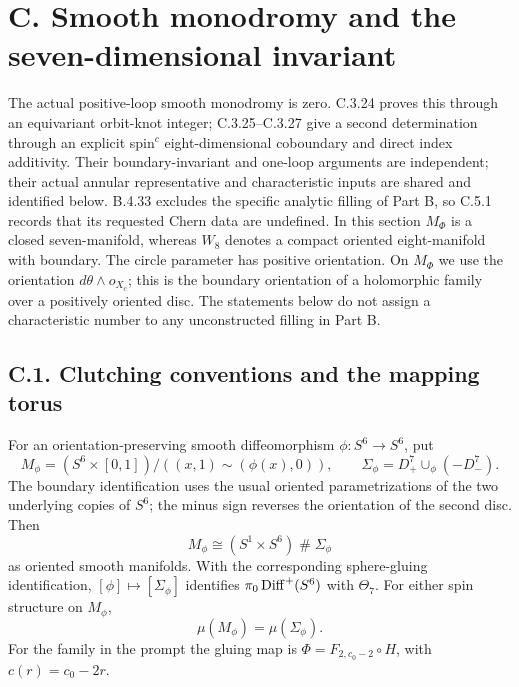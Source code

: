 \section{C. Smooth monodromy and the seven-dimensional invariant}

The actual positive-loop smooth monodromy is zero. C.3.24 proves
this through an equivariant orbit-knot integer; C.3.25--C.3.27
give a second determination through an explicit spin$^c$
eight-dimensional coboundary and direct index additivity. Their
boundary-invariant and one-loop arguments are independent; their
actual annular representative and characteristic inputs are shared
and identified below. B.4.33 excludes the specific analytic
filling of Part B, so C.5.1 records that its requested Chern
data are undefined. In this section $M_\Phi$ is a closed seven-manifold,
whereas $W_8$ denotes a
compact oriented eight-manifold with boundary. The circle parameter
has positive orientation. On $M_\Phi$ we use the orientation
$d\theta\wedge o_{X_c}$; this is the boundary orientation of a
holomorphic family over a positively oriented disc. The statements
below do not assign a characteristic number to any unconstructed
filling in Part B.

\subsection{C.1. Clutching conventions and the mapping torus}

\begin{proposition}
For an orientation-preserving smooth diffeomorphism
$\phi:S^6\to S^6$, put
\[
 M_\phi=(S^6\times[0,1])/((x,1)\sim(\phi(x),0)),\qquad
 \Sigma_\phi=D^7_+\cup_\phi(-D^7_-).
\]
The boundary identification uses the usual oriented parametrizations
of the two underlying copies of $S^6$; the minus sign reverses the
orientation of the second disc. Then
\[
 M_\phi\cong (S^1\times S^6)\mathbin\#\Sigma_\phi
\]
as oriented smooth manifolds. With the corresponding sphere-gluing
identification, $[\phi]\mapsto[\Sigma_\phi]$ identifies
$\pi_0\operatorname{Diff}^+(S^6)$ with $\Theta_7$. For either spin structure on
$M_\phi$,
\[
 \mu(M_\phi)=\mu(\Sigma_\phi).
\]
For the family in the prompt the gluing map is
$\Phi=F_{2,c_0-2}\circ H$, with $c(r)=c_0-2r$.
\end{proposition}

